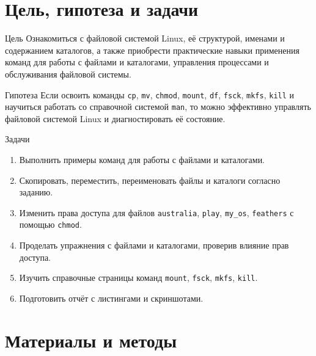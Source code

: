 \documentclass[
  ignorenonframetext,
  aspectratio=169,
  russian,
  aspectratio=169]{beamer}
\providecommand{\tightlist}{%
  \setlength{\itemsep}{0pt}\setlength{\parskip}{0pt}}
\begin{document}
\section{Цель, гипотеза и
задачи}\label{ux446ux435ux43bux44c-ux433ux438ux43fux43eux442ux435ux437ux430-ux438-ux437ux430ux434ux430ux447ux438}

\begin{frame}{Цель}
\protect{}\label{ux446ux435ux43bux44c}
Ознакомиться с файловой системой Linux, её структурой, именами и
содержанием каталогов, а также приобрести практические навыки применения
команд для работы с файлами и каталогами, управления процессами и
обслуживания файловой системы.
\end{frame}

\begin{frame}[fragile]{Гипотеза}
\protect{}\label{ux433ux438ux43fux43eux442ux435ux437ux430}
Если освоить команды \texttt{cp}, \texttt{mv}, \texttt{chmod},
\texttt{mount}, \texttt{df}, \texttt{fsck}, \texttt{mkfs}, \texttt{kill}
и научиться работать со справочной системой \texttt{man}, то можно
эффективно управлять файловой системой Linux и диагностировать её
состояние.
\end{frame}

\begin{frame}[fragile]{Задачи}
\protect{}\label{ux437ux430ux434ux430ux447ux438}
\begin{enumerate}[<+->]
\tightlist
\item
  Выполнить примеры команд для работы с файлами и каталогами.
\item
  Скопировать, переместить, переименовать файлы и каталоги согласно
  заданию.
\item
  Изменить права доступа для файлов \texttt{australia}, \texttt{play},
  \texttt{my\_os}, \texttt{feathers} с помощью \texttt{chmod}.
\item
  Проделать упражнения с файлами и каталогами, проверив влияние прав
  доступа.
\item
  Изучить справочные страницы команд \texttt{mount}, \texttt{fsck},
  \texttt{mkfs}, \texttt{kill}.
\item
  Подготовить отчёт с листингами и скриншотами.
\end{enumerate}
\end{frame}

\section{Материалы и
методы}\label{ux43cux430ux442ux435ux440ux438ux430ux43bux44b-ux438-ux43cux435ux442ux43eux434ux44b}
\end{document}
